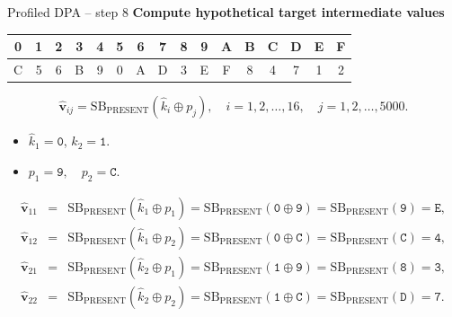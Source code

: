 \begin{frame}{Profiled DPA -- step 8}
    \textbf{Compute hypothetical target intermediate values}
    \begin{table}[htb]
\centering
\ttfamily
\begin{tabular}{cccccccccccccccc}\hline
 0 & 1 & 2 & 3 & 4 & 5 & 6 & 7 & 8 & 9 & A & B & C & D & E & F \\\hline
 C & 5 & 6 & B & 9 & 0 & A & D & 3 & E & F & 8 & 4 & 7 & 1 & 2\\\hline
\end{tabular}
\end{table}
    \begin{example}
    \[
    \hat{\boldsymbol{v}}_{ij}=\text{SB}_{\text{PRESENT}}(\hat{k}_i\oplus p_j),\quad i=1,2,\dots,16,\quad j=1,2,\dots,5000.
    \]
    \begin{itemize}
    \item $\hat{k}_1=\texttt{0}$, $\hat{k}_2=\texttt{1}$.
    \item $p_1=\texttt{9},\quad p_2=\texttt{C}.$
    \end{itemize}
      \begin{eqnarray*}
        \hat{\boldsymbol{v}}_{11}&=&\text{SB}_{\text{PRESENT}}(\hat{k}_1\oplus p_1)=\text{SB}_{\text{PRESENT}}(\texttt{0}\oplus\texttt{9})=\text{SB}_{\text{PRESENT}}(\texttt{9})=\texttt{E},\\
        \hat{\boldsymbol{v}}_{12}&=&\text{SB}_{\text{PRESENT}}(\hat{k}_1\oplus p_2)=\text{SB}_{\text{PRESENT}}(\texttt{0}\oplus\texttt{C})=\text{SB}_{\text{PRESENT}}(\texttt{C})=\texttt{4},\\
        \hat{\boldsymbol{v}}_{21}&=&\text{SB}_{\text{PRESENT}}(\hat{k}_2\oplus p_1)=\text{SB}_{\text{PRESENT}}(\texttt{1}\oplus\texttt{9})=\text{SB}_{\text{PRESENT}}(\texttt{8})=\texttt{3},\\
         \hat{\boldsymbol{v}}_{22}&=&\text{SB}_{\text{PRESENT}}(\hat{k}_2\oplus p_2)=\text{SB}_{\text{PRESENT}}(\texttt{1}\oplus\texttt{C})=\text{SB}_{\text{PRESENT}}(\texttt{D})=\texttt{7}.
    \end{eqnarray*}
    \end{example}
\end{frame}

